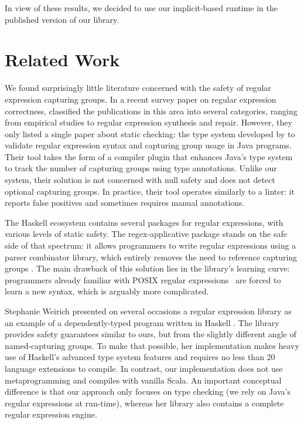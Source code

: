\bigskip

In view of these results, we decided to use our implicit-based runtime in the published version of our library.

\section{Related Work}
\label{sec:related}

We found surprisingly little literature concerned with the safety of regular expression capturing groups.
In a recent survey paper on regular expression correctness, \citet{li2021ensuring} classified the publications in this area into several categories, ranging from empirical studies to regular expression synthesis and repair.
However, they only listed a single paper about static checking: the type system developed by \citet{spishak2012type} to validate regular expression syntax and capturing group usage in Java programs.
Their tool takes the form of a compiler plugin that enhances Java's type system to track the number of capturing groups using type annotations.
Unlike our system, their solution is not concerned with null safety and does not detect optional capturing groups.
In practice, their tool operates similarly to a linter: it reports false positives and sometimes requires manual annotations.

The Haskell ecosystem contains several packages for regular expressions, with various levels of static safety.
The regex-applicative package stands on the safe side of that spectrum: it allows programmers to write regular expressions using a parser combinator library, which entirely removes the need to reference capturing groups \citep{cheplyaka2011regex}.
The main drawback of this solution lies in the library's learning curve: programmers already familiar with POSIX regular expressions~\citep{ieee2018the} are forced to learn a new syntax, which is arguably more complicated.

Stephanie Weirich presented on several occasions a regular expression library as an example of a dependently-typed program written in Haskell \citep{weirich2014examples}.
The library provides safety guarantees similar to ours, but from the slightly different angle of named-capturing groups.
To make that possible, her implementation makes heavy use of Haskell's advanced type system features and requires no less than 20 language extensions to compile.
In contrast, our implementation does not use metaprogramming and compiles with vanilla Scala.
An important conceptual difference is that our approach only focuses on type checking (we rely on Java's regular expressions at run-time), whereas her library also contains a complete regular expression engine.

